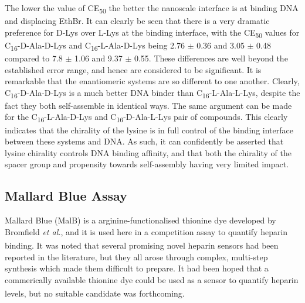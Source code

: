 The lower the value of CE\textsubscript{50} the better the nanoscale interface is at binding DNA and displacing EthBr.  It can clearly be seen that there is a very dramatic preference for D-Lys over L-Lys at the binding interface, with the CE\textsubscript{50} values for C\textsubscript{16}-D-Ala-D-Lys and C\textsubscript{16}-L-Ala-D-Lys being 2.76 $\pm$ 0.36 and 3.05 $\pm$ 0.48 compared to 7.8 $\pm$ 1.06 and 9.37 $\pm$ 0.55. These differences are well beyond the established error range, and hence are considered to be significant. It is remarkable that the enantiomeric systems are so different to one another. Clearly, C\textsubscript{16}-D-Ala-D-Lys is a much better DNA binder than C\textsubscript{16}-L-Ala-L-Lys, despite the fact they both self-assemble in identical ways. The same argument can be made for the C\textsubscript{16}-L-Ala-D-Lys and C\textsubscript{16}-D-Ala-L-Lys pair of compounds. This clearly indicates that the chirality of the lysine is in full control of the binding interface between these systems and DNA. As such, it can confidently be asserted that lysine chirality controls DNA binding affinity, and that both the chirality of the spacer group and propensity towards self-assembly having very limited impact. 

\subsection{Mallard Blue Assay}
Mallard Blue (MalB) is a arginine-functionalised thionine dye developed by Bromfield \textit{et al.}, and it is used here in a competition assay to quantify heparin binding.\textsuperscript{\cite{Bromfield2013MallardMedia}} It was noted that several promising novel heparin sensors had been reported in the literature, but they all arose through complex, multi-step synthesis which made them difficult to prepare. It had been hoped that a commerically available thionine dye could be used as a sensor to quantify heparin levels, but no suitable candidate was forthcoming.\textsuperscript{\cite{Bromfield2014MultivalentSensing}} 
\newline

